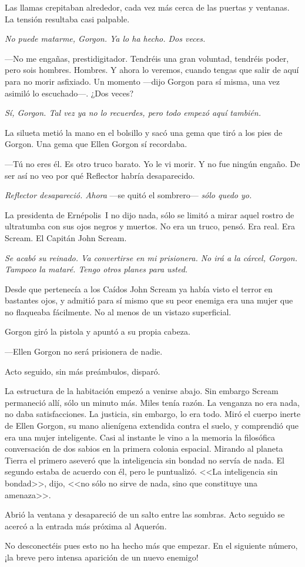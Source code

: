 Las llamas crepitaban alrededor, cada vez más cerca de las puertas y ventanas. La tensión resultaba casi palpable.

\emph{No puede matarme, Gorgon. Ya lo ha hecho. Dos veces.}

---No me engañas, prestidigitador. Tendréis una gran voluntad, tendréis poder, pero sois hombres. Hombres. Y ahora lo veremos, cuando tengas que salir de aquí para no morir asfixiado. Un momento ---dijo Gorgon para sí misma, una vez asimiló lo escuchado---. ¿Dos veces?

\emph{Sí, Gorgon. Tal vez ya no lo recuerdes, pero todo empezó aquí también.}

La silueta metió la mano en el bolsillo y sacó una gema que tiró a los pies de Gorgon. Una gema que Ellen Gorgon sí recordaba.

---Tú no eres él. Es otro truco barato. Yo le vi morir. Y no fue ningún engaño. De ser así no veo por qué Reflector habría desaparecido.

\emph{Reflector desapareció. Ahora} ---se quitó el sombrero--- \emph{sólo quedo yo.}

La presidenta de Ernépolis~I no dijo nada, sólo se limitó a mirar aquel rostro de ultratumba con sus ojos negros y muertos. No era un truco, pensó. Era real. Era Scream. El Capitán John Scream.

\emph{Se acabó su reinado. Va convertirse en mi prisionera. No irá a la cárcel, Gorgon. Tampoco la mataré. Tengo otros planes para usted.}

Desde que pertenecía a los Caídos John Scream ya había visto el terror en bastantes ojos, y admitió para sí mismo que su peor enemiga era una mujer que no flaqueaba fácilmente. No al menos de un vistazo superficial.

Gorgon giró la pistola y apuntó a su propia cabeza.

---Ellen Gorgon no será prisionera de nadie.

Acto seguido, sin más preámbulos, disparó.

La estructura de la habitación empezó a venirse abajo. Sin embargo Scream permaneció allí, sólo un minuto más. Miles tenía razón. La venganza no era nada, no daba satisfacciones. La justicia, sin embargo, lo era todo. Miró el cuerpo inerte de Ellen Gorgon, su mano alienígena extendida contra el suelo, y comprendió que era una mujer inteligente. Casi al instante le vino a la memoria la filosófica conversación de dos sabios en la primera colonia espacial. Mirando al planeta Tierra el primero aseveró que la inteligencia sin bondad no servía de nada. El segundo estaba de acuerdo con él, pero le puntualizó. <<La inteligencia sin bondad>>, dijo, <<no sólo no sirve de nada, sino que constituye una amenaza>>.

Abrió la ventana y desapareció de un salto entre las sombras. Acto seguido se acercó a la entrada más próxima al Aquerón.

\begin{next}
    No desconectéis pues esto no ha hecho más que empezar. En el siguiente número, ¡la breve pero intensa aparición de un nuevo enemigo!
\end{next}

\endinput
